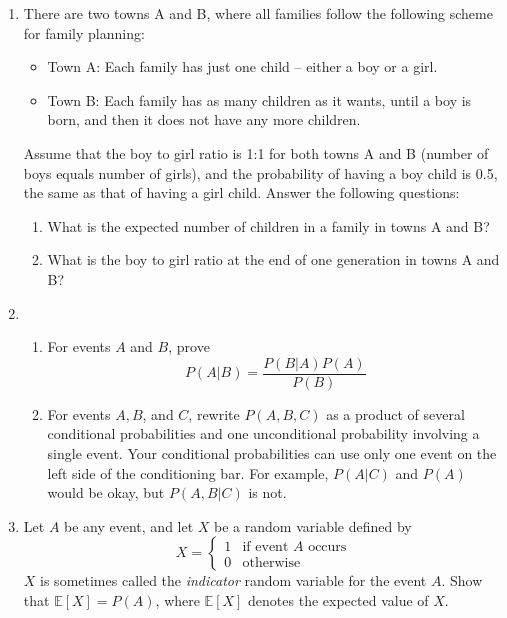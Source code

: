 \begin{enumerate}
\begin{enumerate}
\item  There are two towns A and B, where all families follow the following scheme for family planning:
\begin{itemize}
\item Town A: Each family has just one child -- either a boy or a girl.
\item Town B: Each family has as many children as it wants, until a boy is born, and then it does not have any more children.
\end{itemize}
Assume that the boy to girl ratio is 1:1 for both towns A and B (number of boys equals number of girls), and the probability of having a boy child is 0.5, the same as that of having a girl child. Answer the following questions:
\begin{enumerate}
\item What is the expected number of children in a family in towns A and B?
\item What is the boy to girl ratio at the end of one generation in towns A and B?
\end{enumerate}

\item 
\begin{enumerate}
	\item For events $A$ and $B$, prove
	$$
	P(A|B) = \frac{P(B|A) P(A) }{P(B)}
	$$ 
	\item For events $A, B$, and $C$, rewrite $P(A, B, C)$ as a product of several conditional probabilities and one unconditional probability involving a single event. Your conditional probabilities can use only one event on the left side of the conditioning bar. For example, $P(A|C)$ and $P(A)$ would be okay, but $P(A, B |C)$ is not.
	\end{enumerate}
	
	\item  Let $A$ be any event, and let $X$ be a random variable defined by 
	$$
	X = 
	\begin{cases}
	1 & \text{if event $A$ occurs} \\ 
	0 & \text{otherwise}
	\end{cases}
	$$
	$X$ is sometimes called the \textit{indicator} random variable for the event $A$. Show that $\mathbb{E}[X] = P(A)$, where $\mathbb{E}[X]$ denotes the expected value of $X$.
	

\end{enumerate}
\end{enumerate}
